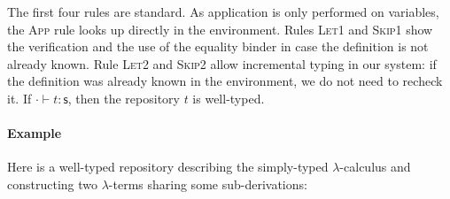 \documentclass{article}
\newcommand{\sort}{\textsf{s}}
\begin{document}
The first four rules are standard. As application is only performed on
variables, the \textsc{App} rule looks up directly in the
environment. Rules \textsc{Let1} and \textsc{Skip1} show the
verification and the use of the equality binder in case the definition
is not already known. Rule \textsc{Let2} and \textsc{Skip2} allow
incremental typing in our system: if the definition was already known
in the environment, we do not need to recheck it. If $\cdot\vdash
t:\sort$, then the repository $t$ is well-typed.

\paragraph{Example} 

Here is a well-typed repository describing the simply-typed
$\lambda$-calculus and constructing two $\lambda$-terms sharing some
sub-derivations: 
\end{document}
